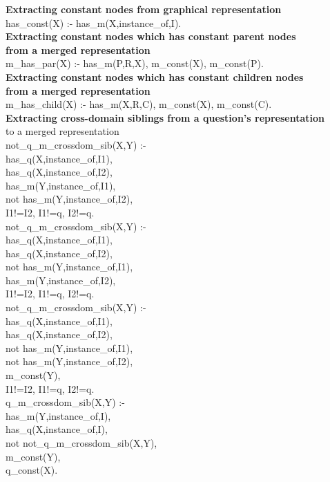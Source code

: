 \textbf{Extracting constant nodes from graphical representation}\\
has\_const(X) :- has\_m(X,instance\_of,I).\\

\textbf{Extracting constant nodes which has constant parent nodes\\
from a merged representation}\\
m\_has\_par(X) :- has\_m(P,R,X), m\_const(X), m\_const(P).\\

\textbf{Extracting constant nodes which has constant children nodes\\
from a merged representation}\\
m\_has\_child(X) :- has\_m(X,R,C), m\_const(X), m\_const(C).\\

\textbf{Extracting cross-domain siblings from a question’s representation}\\
to a merged representation\\
not\_q\_m\_crossdom\_sib(X,Y) :-\\
has\_q(X,instance\_of,I1),\\
has\_q(X,instance\_of,I2),\\
has\_m(Y,instance\_of,I1),\\
not has\_m(Y,instance\_of,I2),\\
I1!=I2, I1!=q, I2!=q.\\
not\_q\_m\_crossdom\_sib(X,Y) :-\\
has\_q(X,instance\_of,I1),\\
has\_q(X,instance\_of,I2),\\
not has\_m(Y,instance\_of,I1),\\
has\_m(Y,instance\_of,I2),\\
I1!=I2, I1!=q, I2!=q.\\
not\_q\_m\_crossdom\_sib(X,Y) :-\\
has\_q(X,instance\_of,I1),\\
has\_q(X,instance\_of,I2),\\
not has\_m(Y,instance\_of,I1),\\
not has\_m(Y,instance\_of,I2),\\
m\_const(Y),\\
I1!=I2, I1!=q, I2!=q.\\
q\_m\_crossdom\_sib(X,Y) :-\\
has\_m(Y,instance\_of,I),\\
has\_q(X,instance\_of,I),\\
not not\_q\_m\_crossdom\_sib(X,Y),\\
m\_const(Y),\\
q\_const(X).\\

